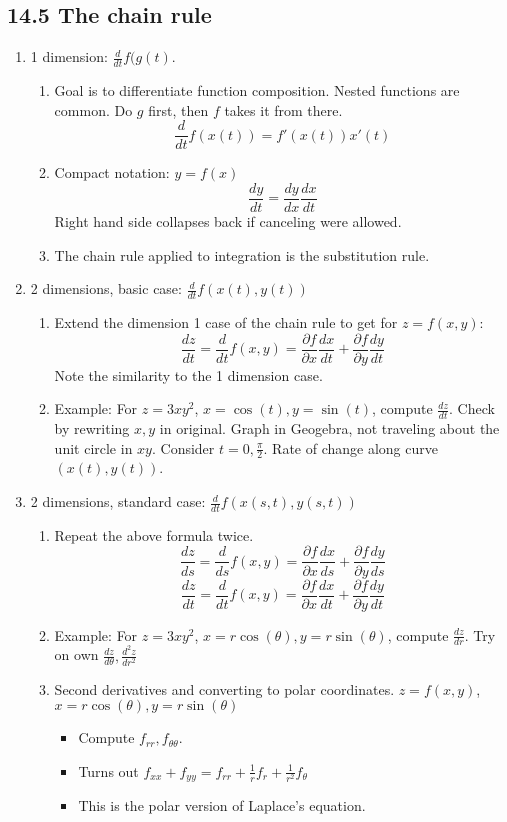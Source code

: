 \documentclass{article}
\begin{document}
\subsection{14.5 The chain rule}

\begin{enumerate}
\item 1 dimension: $\frac{d}{dt} f(g(t)$.
\begin{enumerate}
\item Goal is to differentiate function composition. Nested functions are common. Do $g$ first, then $f$ takes it from there.
\[
\frac{d}{dt} f(x(t)) = f'(x(t)) x'(t)
\]
\item Compact notation: $y=f(x)$
\[
\frac{dy}{dt} = \frac{dy}{dx} \frac{dx}{dt}
\]
Right hand side collapses back if canceling were allowed.
\item The chain rule applied to integration is the substitution rule.
\end{enumerate}

\item 2 dimensions, basic case: $\frac{d}{dt} f(x(t), y(t))$
\begin{enumerate}
\item Extend the dimension 1 case of the chain rule to get for $z=f(x,y)$:
\[
\frac{dz}{dt} = \frac{d}{dt} f(x,y) = \frac{\partial f}{\partial x} \frac{dx}{dt} + \frac{\partial f}{\partial y} \frac{dy}{dt}
\]
Note the similarity to the 1 dimension case.
\item Example: For $z=3xy^2$, $x=\cos(t), y=\sin(t)$, compute $\frac{dz}{dt}$. Check by rewriting $x,y$ in original. Graph in Geogebra, not traveling about the unit circle in $xy$. Consider $t=0, \frac{\pi}{2}$. Rate of change along curve $(x(t),y(t))$.
\end{enumerate}

\item 2 dimensions, standard case: $\frac{d}{dt} f(x(s,t), y(s,t))$
\begin{enumerate}
\item Repeat the above formula twice.
\[
\frac{dz}{ds} = \frac{d}{ds} f(x,y) = \frac{\partial f}{\partial x} \frac{dx}{ds} + \frac{\partial f}{\partial y} \frac{dy}{ds}
\]
\[
\frac{dz}{dt} = \frac{d}{dt} f(x,y) = \frac{\partial f}{\partial x} \frac{dx}{dt} + \frac{\partial f}{\partial y} \frac{dy}{dt}
\]
\item Example: For $z=3xy^2$, $x=r\cos(\theta), y=r\sin(\theta)$, compute $\frac{dz}{dr}$. Try on own $\frac{dz}{d\theta}, \frac{d^2z}{dr^2}$
\item Second derivatives and converting to polar coordinates. $z=f(x,y)$, $x=r\cos(\theta), y=r\sin(\theta)$
\begin{itemize}
\item Compute $f_{rr}, f_{\theta \theta}$.
\item Turns out $f_{xx}+f_{yy}=f_{rr}+\frac{1}{r}f_r + \frac{1}{r^2}f_{\theta}$
\item This is the polar version of Laplace's equation.
\end{itemize}
\end{enumerate}


\end{enumerate}
\end{document}
